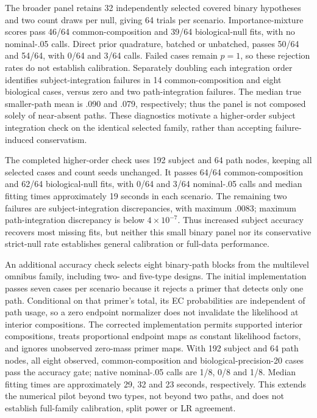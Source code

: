 \documentclass[11pt]{article}
\begin{document}
The broader panel retains 32 independently selected covered binary hypotheses and two count draws per null, giving 64 trials per scenario. Importance-mixture scores pass 46/64 common-composition and 39/64 biological-null fits, with no nominal-.05 calls. Direct prior quadrature, batched or unbatched, passes 50/64 and 54/64, with 0/64 and 3/64 calls. Failed cases remain \(p=1\), so these rejection rates do not establish calibration. Separately doubling each integration order identifies subject-integration failures in 14 common-composition and eight biological cases, versus zero and two path-integration failures. The median true smaller-path mean is .090 and .079, respectively; thus the panel is not composed solely of near-absent paths. These diagnostics motivate a higher-order subject integration check on the identical selected family, rather than accepting failure-induced conservatism.

The completed higher-order check uses 192 subject and 64 path nodes, keeping all selected cases and count seeds unchanged. It passes 64/64 common-composition and 62/64 biological-null fits, with 0/64 and 3/64 nominal-.05 calls and median fitting times approximately 19 seconds in each scenario. The remaining two failures are subject-integration discrepancies, with maximum .0083; maximum path-integration discrepancy is below \(4\times10^{-7}\). Thus increased subject accuracy recovers most missing fits, but neither this small binary panel nor its conservative strict-null rate establishes general calibration or full-data performance.

An additional accuracy check selects eight binary-path blocks from the multilevel omnibus family, including two- and five-type designs. The initial implementation passes seven cases per scenario because it rejects a primer that detects only one path. Conditional on that primer's total, its EC probabilities are independent of path usage, so a zero endpoint normalizer does not invalidate the likelihood at interior compositions. The corrected implementation permits supported interior compositions, treats proportional endpoint maps as constant likelihood factors, and ignores unobserved zero-mass primer maps. With 192 subject and 64 path nodes, all eight observed, common-composition and biological-precision-20 cases pass the accuracy gate; native nominal-.05 calls are 1/8, 0/8 and 1/8. Median fitting times are approximately 29, 32 and 23 seconds, respectively. This extends the numerical pilot beyond two types, not beyond two paths, and does not establish full-family calibration, split power or LR agreement.
\end{document}
